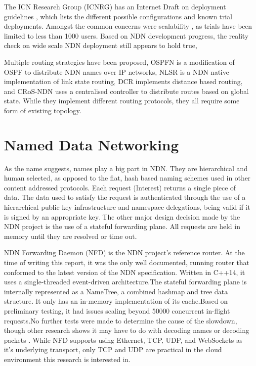 \documentclass[letterpaper,12pt]{article}
\begin{document}
The ICN Research Group (ICNRG) has an Internet Draft on deployment guidelines \cite{deployguide},
which lists the different possible configurations and known trial deployments.
Amongst the common concerns were scalability \cite{scalableoverview} \cite{scalablenote},
as trials have been limited to less than 1000 users.
Based on NDN development progress,
the reality check \cite{reality} on wide scale NDN deployment still appears to hold true,

Multiple routing strategies have been proposed,
OSPFN \cite{ospfn} is a modification of OSPF to distribute NDN names over IP networks,
NLSR  \cite{nlsr} is a NDN native implementation of link state routing,
DCR \cite{dcr} implements distance based routing,
and CRoS-NDN \cite{cros}  uses a centralised controller to distribute routes based on global state.
While they implement different routing protocols,
they all require some form of existing topology.




\section*{Named Data Networking}

As the name suggests, names play a big part in NDN. They are hierarchical and human selected, as opposed to the flat, hash based naming schemes used in other content addressed protocols. Each request (Interest) returns a single piece of data. The data used to satisfy the request is authenticated through the use of a hierarchical public key infrastructure and namespace delegations, being valid if it is signed by an appropriate key. The other major design decision made by the NDN project is the use of a stateful forwarding plane. All requests are held in memory until they are resolved or time out.

NDN Forwarding Daemon (NFD) is the NDN project's reference router. At the time of writing this report, it was the only well documented, running router that conformed to the latest version of the NDN specification. Written in C++14, it uses a single-threaded event-driven architecture.The stateful forwarding plane is internally represented as a NameTree, a combined hashmap and tree data structure. It only has an in-memory implementation of its cache.Based on preliminary testing, it had issues scaling beyond 50000 concurrent in-flight requests.No further tests were made to determine the cause of the slowdown, though other research shows it may have to do with decoding names \cite{prefixscale} or decoding packets \cite{pidinterop}. While NFD supports using Ethernet, TCP, UDP, and WebSockets as it's underlying transport, only TCP and UDP are practical in the cloud environment this research is interested in.
\end{document}

